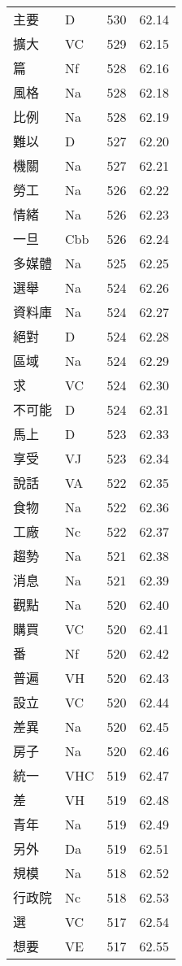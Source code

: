 \documentclass[twocolumn]{book}
\begin{document}
\begin{supertabular}{llrr}
主要 & D & 530 &  62.14\\
擴大 & VC & 529 &  62.15\\
篇 & Nf & 528 &  62.16\\
風格 & Na & 528 &  62.18\\
比例 & Na & 528 &  62.19\\
難以 & D & 527 &  62.20\\
機關 & Na & 527 &  62.21\\
勞工 & Na & 526 &  62.22\\
情緒 & Na & 526 &  62.23\\
一旦 & Cbb & 526 &  62.24\\
多媒體 & Na & 525 &  62.25\\
選舉 & Na & 524 &  62.26\\
資料庫 & Na & 524 &  62.27\\
絕對 & D & 524 &  62.28\\
區域 & Na & 524 &  62.29\\
求 & VC & 524 &  62.30\\
不可能 & D & 524 &  62.31\\
馬上 & D & 523 &  62.33\\
享受 & VJ & 523 &  62.34\\
說話 & VA & 522 &  62.35\\
食物 & Na & 522 &  62.36\\
工廠 & Nc & 522 &  62.37\\
趨勢 & Na & 521 &  62.38\\
消息 & Na & 521 &  62.39\\
觀點 & Na & 520 &  62.40\\
購買 & VC & 520 &  62.41\\
番 & Nf & 520 &  62.42\\
普遍 & VH & 520 &  62.43\\
設立 & VC & 520 &  62.44\\
差異 & Na & 520 &  62.45\\
房子 & Na & 520 &  62.46\\
統一 & VHC & 519 &  62.47\\
差 & VH & 519 &  62.48\\
青年 & Na & 519 &  62.49\\
另外 & Da & 519 &  62.51\\
規模 & Na & 518 &  62.52\\
行政院 & Nc & 518 &  62.53\\
選 & VC & 517 &  62.54\\
想要 & VE & 517 &  62.55\\

\end{supertabular}
\end{document}
